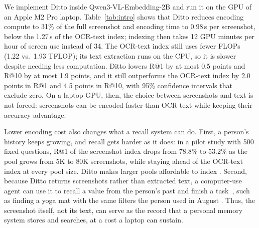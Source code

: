 We implement Ditto inside Qwen3-VL-Embedding-2B and run it on the GPU of an
Apple M2 Pro laptop. Table~\ref{tab:intro} shows that Ditto reduces encoding
compute to 31\% of the full screenshot and encoding time to 0.98\,s per
screenshot, below the 1.27\,s of the OCR-text index; indexing then takes 12
GPU minutes per hour of screen use instead of 34. The OCR-text index still
uses fewer FLOPs (1.22 vs.\ 1.93 TFLOP); its text extraction runs on the
CPU, so it is slower despite needing less computation. Ditto lowers R@1 by
at most 0.5 points and R@10 by at most 1.9 points, and it still outperforms
the OCR-text index by 2.0 points in R@1 and 4.5 points in R@10, with 95\%
confidence intervals that exclude zero. On a laptop GPU, then, the choice
between screenshots and text is not forced: screenshots can be encoded
faster than OCR text while keeping their accuracy advantage.

Lower encoding cost also changes what a recall system can do. First, a
person's history keeps growing, and recall gets harder as it does: in a
pilot study with 500 fixed questions, R@1 of the screenshot index drops from
78.8\% to 53.2\% as the pool grows from 5K to 80K screenshots, while staying
ahead of the OCR-text index at every pool size. Ditto makes larger pools
affordable to index . Second,
because Ditto returns screenshots rather than extracted text, a computer-use
agent can use it to recall a value from the person's past and finish a
task~\cite{yang2026personatrail}, such as finding a yoga mat with the same
filters the person used in August . Thus, the screenshot itself, not its text, can serve
as the record that a personal memory system stores and searches, at a cost
a laptop can sustain.

